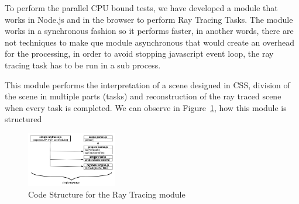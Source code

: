 To perform the parallel CPU bound tests, we have developed a module that works in Node.js and in the browser to perform Ray Tracing Tasks. The module works in a synchronous fashion so it performs faster, in another words, there are not techniques to make que module asynchronous that would create an overhead for the processing, in order to avoid stopping javascript event loop, the ray tracing task has to be run in a sub process.

This module performs the interpretation of a scene designed in CSS, division of the scene in multiple parts (tasks) and reconstruction of the ray traced scene when every task is completed. We can observe in Figure~\ref{fig:d-s-r}, how this module is structured

\begin{figure}[h!]
  \centering
  \includegraphics[width=0.35\textwidth]{figs/diagram-simple-raytracer}
  \caption{Code Structure for the Ray Tracing module}
  \label{fig:d-s-r}
\end{figure}

